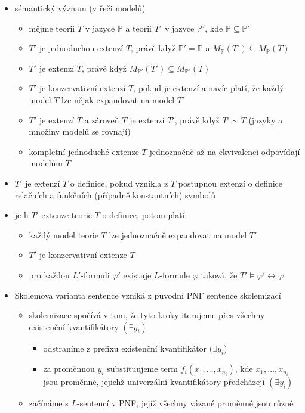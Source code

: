 \begin{itemize}
\begin{itemize}
\item sémantický význam (v řeči modelů)
\begin{itemize}
\item mějme teorii $T$ v jazyce $\mathbb P$ a teorii $T'$ v jazyce $\mathbb P'$, kde $\mathbb P\subseteq\mathbb P'$
\item $T'$ je jednoduchou extenzí $T$, právě když $\mathbb P'=\mathbb P$ a $M_\mathbb P(T')\subseteq M_\mathbb P(T)$
\item $T'$ je extenzí $T$, právě když $M_{\mathbb P'}(T')\subseteq M_{\mathbb P'}(T)$
\item $T'$ je konzervativní extenzí $T$, pokud je extenzí a navíc platí, že každý model $T$ lze nějak expandovat na model $T'$
\item $T'$ je extenzí $T$ a zároveň $T$ je extenzí $T'$, právě když $T'\sim T$ (jazyky a množiny modelů se rovnají)
\item kompletní jednoduché extenze $T$ jednoznačně až na ekvivalenci odpovídají modelům $T$
\end{itemize}
\item $T'$ je extenzí $T$ o definice, pokud vznikla z $T$ postupnou extenzí o definice relačních a funkčních (případně konstantních) symbolů
\item je-li $T'$ extenze teorie $T$ o definice, potom platí:
\begin{itemize}
\item každý model teorie $T$ lze jednoznačně expandovat na model $T'$
\item $T'$ je konzervativní extenze $T$
\item pro každou $L'$-formuli $\varphi'$ existuje $L$-formule $\varphi$ taková, že $T'\models\varphi'\leftrightarrow\varphi$
\end{itemize}
\item Skolemova varianta sentence vzniká z původní PNF sentence skolemizací
\begin{itemize}
\item skolemizace spočívá v tom, že tyto kroky iterujeme přes všechny existenční kvantifikátory $(\exists y_i)$
\begin{itemize}
\item odstraníme z prefixu existenční kvantifikátor $(\exists y_i$)
\item za proměnnou $y_i$ substituujeme term $f_i(x_1,\dots,x_{n_i})$, kde $x_1,\dots,x_{n_i}$ jsou proměnné, jejichž univerzální kvantifikátory předcházejí $(\exists y_i)$
\end{itemize}
\item začínáme s $L$-sentencí v PNF, jejíž všechny vázané proměnné jsou různé

\end{itemize}
\end{itemize}
\end{itemize}
